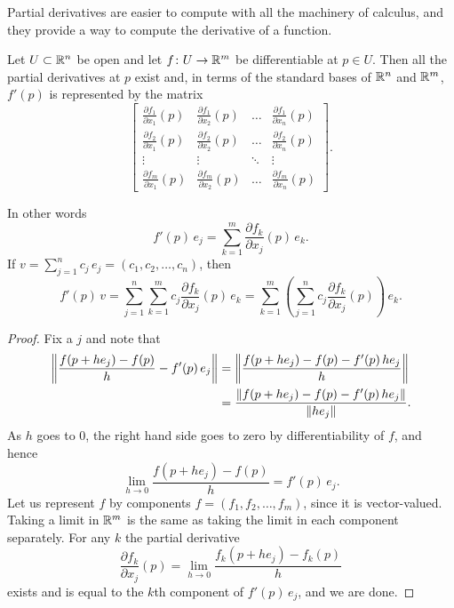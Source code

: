 Partial derivatives are easier to compute with all the machinery of
calculus, and they provide a way to compute the derivative of a
function.

\begin{prop} \label{mv:prop:jacobianmatrix}
Let $U \subset {\mathbb{R}}^n$ be open and let $f \colon U \to {\mathbb{R}}^m$ be
differentiable at $p \in U$.  Then all the partial derivatives at $p$
exist and, in terms of the standard bases of ${\mathbb{R}}^n$ and ${\mathbb{R}}^m$,
$f'(p)$ is represented by the matrix
\begin{equation*}
\begin{bmatrix}
\frac{\partial f_1}{\partial x_1}(p)
&
\frac{\partial f_1}{\partial x_2}(p)
& \ldots &
\frac{\partial f_1}{\partial x_n}(p)
\\[6pt]
\frac{\partial f_2}{\partial x_1}(p)
&
\frac{\partial f_2}{\partial x_2}(p)
& \ldots &
\frac{\partial f_2}{\partial x_n}(p)
\\
\vdots & \vdots & \ddots & \vdots
\\
\frac{\partial f_m}{\partial x_1}(p)
&
\frac{\partial f_m}{\partial x_2}(p)
& \ldots &
\frac{\partial f_m}{\partial x_n}(p)
\end{bmatrix} .
\end{equation*}
\end{prop}


In other words
\begin{equation*}
f'(p) \, e_j =
\sum_{k=1}^m
\frac{\partial f_k}{\partial x_j}(p) \,e_k .
\end{equation*}
If $v = \sum_{j=1}^n c_j\, e_j = (c_1,c_2,\ldots,c_n)$, then
\begin{equation*}
f'(p) \, v =
\sum_{j=1}^n
\sum_{k=1}^m
 c_j
\frac{\partial f_k}{\partial x_j}(p) \,e_k
=
\sum_{k=1}^m
\left(
\sum_{j=1}^n
 c_j
\frac{\partial f_k}{\partial x_j}(p) \right) \,e_k .
\end{equation*}

\begin{proof}
Fix a $j$ and note that
\begin{equation*}
\begin{split}
\left\lVert {\frac{f(p+h e_j)-f(p)}{h} - f'(p) \, e_j} \right\rVert & = 
\left\lVert {\frac{f(p+h e_j)-f(p) - f'(p) \, h e_j}{h}} \right\rVert \\
& =
\frac{\lVert {f(p+h e_j)-f(p) - f'(p) \, h e_j} \rVert}{\lVert {h e_j} \rVert} .
\end{split}
\end{equation*}
As $h$ goes to 0, the right hand side goes to zero by
differentiability of $f$, and hence
\begin{equation*}
\lim_{h \to 0}
\frac{f(p+h e_j)-f(p)}{h} = f'(p) \, e_j  .
\end{equation*}
Let us represent $f$ by components
$f = (f_1,f_2,\ldots,f_m)$, since it is vector-valued.
Taking a limit in ${\mathbb{R}}^m$
is the same as taking the limit in each component separately.  
For any $k$
the partial derivative
\begin{equation*}
\frac{\partial f_k}{\partial x_j} (p)
=
\lim_{h \to 0}
\frac{f_k(p+h e_j)-f_k(p)}{h}
\end{equation*}
exists and 
is equal to the $k$th component of $f'(p)\, e_j$, and we are done.
\end{proof}

